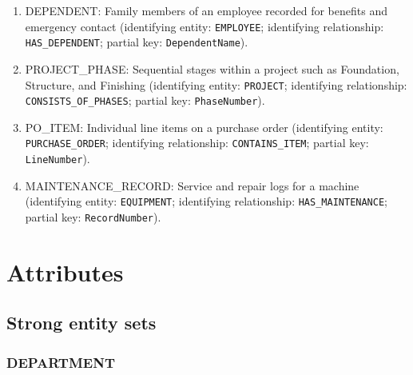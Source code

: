 \documentclass[a4paper,12pt]{report}
\providecommand{\tightlist}{%
  \setlength{\itemsep}{0pt}\setlength{\parskip}{0pt}}
\begin{document}
\begin{enumerate}
\def\labelenumi{\arabic{enumi}.}
\tightlist
\item
  DEPENDENT: Family members of an employee recorded for benefits and emergency contact (\allowbreak{}identifying entity: \texttt{EMPLOYEE}; identifying relationship: \texttt{HAS\_\allowbreak{}DEPENDENT}; partial key: \texttt{DependentName}).
\item
  PROJECT\_\allowbreak{}PHASE: Sequential stages within a project such as Foundation, Structure, and Finishing (\allowbreak{}identifying entity: \texttt{PROJECT}; identifying relationship: \texttt{CONSISTS\_\allowbreak{}OF\_\allowbreak{}PHASES}; partial key: \texttt{PhaseNumber}).
\item
  PO\_\allowbreak{}ITEM: Individual line items on a purchase order (\allowbreak{}identifying entity: \texttt{PURCHASE\_\allowbreak{}ORDER}; identifying relationship: \texttt{CONTAINS\_\allowbreak{}ITEM}; partial key: \texttt{LineNumber}).
\item
  MAINTENANCE\_\allowbreak{}RECORD: Service and repair logs for a machine (\allowbreak{}identifying entity: \texttt{EQUIPMENT}; identifying relationship: \texttt{HAS\_\allowbreak{}MAINTENANCE}; partial key: \texttt{RecordNumber}).
\end{enumerate}

\section{Attributes}\label{attributes}

\subsection{Strong entity sets}\label{strong-entity-sets-1}

\subsubsection{DEPARTMENT}\label{department}
\end{document}
